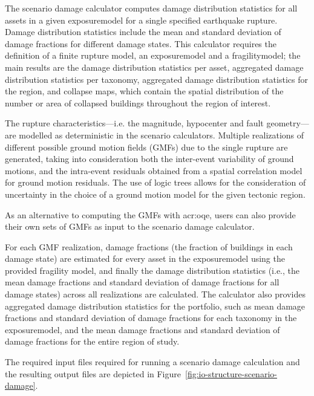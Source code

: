 The scenario damage calculator computes damage distribution statistics for all
assets in a given \gls{exposuremodel} for a single specified earthquake
rupture. Damage distribution statistics include the mean and standard
deviation of damage fractions for different damage states. This calculator
requires the definition of a finite rupture model, an \gls{exposuremodel} and
a \gls{fragilitymodel}; the main results are the damage distribution
statistics per asset, aggregated damage distribution statistics per taxonomy,
aggregated damage distribution statistics for the region, and collapse maps,
which contain the spatial distribution of the number or area of collapsed
buildings throughout the region of interest.

The rupture characteristics---i.e. the magnitude, hypocenter and fault
geometry---are modelled as deterministic in the scenario calculators. Multiple
realizations of different possible ground motion fields (GMFs) due to the
single rupture are generated, taking into consideration both the inter-event
variability of ground motions, and the intra-event residuals obtained from a
spatial correlation model for ground motion residuals. The use of logic trees
allows for the consideration of uncertainty in the choice of a ground motion
model for the given tectonic region.

As an alternative to computing the GMFs with \glsdesc{acr:oqe}, users can also
provide their own sets of GMFs as input to the scenario damage calculator.

For each GMF realization, damage fractions (the fraction of buildings in each
damage state) are estimated for every asset in the \gls{exposuremodel} using the
provided fragility model, and finally the damage distribution statistics
(i.e., the mean damage fractions and standard deviation of damage fractions
for all damage states) across all realizations are calculated. The calculator
also provides aggregated damage distribution statistics for the portfolio,
such as mean damage fractions and standard deviation of damage fractions for
each taxonomy in the \gls{exposuremodel}, and the mean damage fractions and
standard deviation of damage fractions for the entire region of study.

The required input files required for running a scenario damage calculation
and the resulting output files are depicted in Figure~\ref{fig:io-structure-scenario-damage}.

